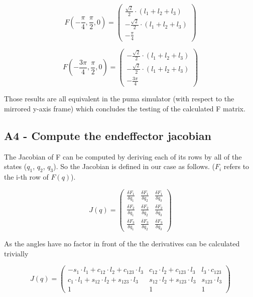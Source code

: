 \begin{equation}
    F(-\frac{\pi}{4},\frac{\pi}{2},0) = \begin{pmatrix} 
    \frac{\sqrt{2}}{2}\cdot (l_1 + l_2 + l_3)\\
    -\frac{\sqrt{2}}{2}\cdot (l_1 + l_2 + l_3) \\
    -\frac{\pi}{4}  \end{pmatrix}
\end{equation}

\begin{equation}
    F(-\frac{3\pi}{4},\frac{\pi}{2},0) = \begin{pmatrix} 
    -\frac{\sqrt{2}}{2}\cdot (l_1 + l_2 + l_3)\\
    -\frac{\sqrt{2}}{2}\cdot (l_1 + l_2 + l_3) \\
    -\frac{3\pi}{4}  \end{pmatrix}
\end{equation}

Those results are all equivalent in the puma simulator (with respect to the mirrored y-axis frame) which concludes the testing of the calculated F matrix. 

\subsection{A4 - Compute the endeffector jacobian}

The Jacobian of F can be computed by deriving each of its rows by all of the states ($q_1$, $q_2$, $q_3$). So the Jacobian is defined in our case as follows. ($F_i$ refers to the i-th row of $F(q)$).



\begin{equation}
    J(q) = \begin{pmatrix} 
    \frac{\delta F_1}{\delta q_1}&  \frac{\delta F_1}{\delta q_2}&  \frac{\delta F_1}{\delta q_3}\\
    \frac{\delta F_2}{\delta q_1}&  \frac{\delta F_2}{\delta q_2}&  \frac{\delta F_2}{\delta q_3} \\
    \frac{\delta F_3}{\delta q_1}&  \frac{\delta F_3}{\delta q_2}&  \frac{\delta F_3}{\delta q_3}  \end{pmatrix}
\end{equation}

As the angles have no factor in front of the the derivatives can be calculated trivially


\begin{equation}
    J(q)  = \begin{pmatrix} 
  -s_1 \cdot l_1 + c_{12} \cdot l_2 + c_{123} \cdot l_3
  &  c_{12} \cdot l_2 + c_{123} \cdot  l_3& l_3\cdot c_{123}
  \\
   c_1 \cdot l_1 + s_{12} \cdot l_2 + s_{123} \cdot l_3 &  s_{12} \cdot l_2 + s_{123} \cdot l_3&  s_{123} \cdot l_3 \\ 
   1 & 1 & 1\end{pmatrix}
   \label{eq:Jmatrix}
\end{equation}


